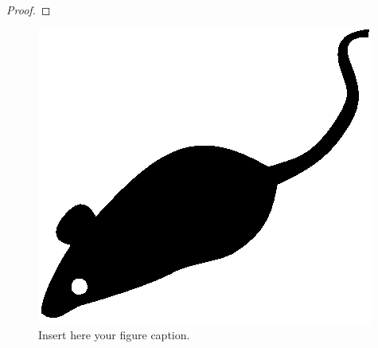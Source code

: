 \begin{quote}
	\lipsum[1]
\end{quote}

\begin{theorem}
	\label{thm:sample}
	\lipsum[1]
	\begin{proof}
		\lipsum[1]
	\end{proof}
\end{theorem}

\begin{corollary}
	\label[cor]{cor:sample}
	\lipsum[1]
\end{corollary}

\begin{lemma}
	\label[lem]{lem:sample}
	\lipsum[1]
\end{lemma}


\begin{figure}[tp]
	\centering
	\includegraphics{./fig/acmlarge-mouse}
	\caption{Insert here your figure caption.}
	\label{fig:sample-1}
\end{figure}


